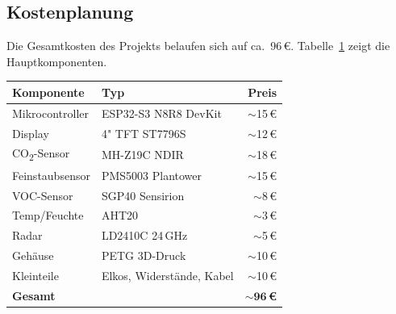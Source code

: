 \subsection{Kostenplanung}

Die Gesamtkosten des Projekts belaufen sich auf ca.\ 96\,\euro{}. Tabelle~\ref{tab:costs} zeigt die Hauptkomponenten.

\begin{table}[htb]
\centering
\renewcommand{\arraystretch}{1.3}
\label{tab:costs}
\begin{tabular}{l l r}
\toprule
\rowcolor{tableheader}
\textbf{Komponente} & \textbf{Typ} & \textbf{Preis} \\
\midrule
Mikrocontroller & ESP32-S3 N8R8 DevKit & ${\sim}$15\,\euro{} \\
Display & 4" TFT ST7796S & ${\sim}$12\,\euro{} \\
CO\textsubscript{2}-Sensor & MH-Z19C NDIR & ${\sim}$18\,\euro{} \\
Feinstaubsensor & PMS5003 Plantower & ${\sim}$15\,\euro{} \\
VOC-Sensor & SGP40 Sensirion & ${\sim}$8\,\euro{} \\
Temp/Feuchte & AHT20 & ${\sim}$3\,\euro{} \\
Radar & LD2410C 24\,GHz & ${\sim}$5\,\euro{} \\
Gehäuse & PETG 3D-Druck & ${\sim}$10\,\euro{} \\
Kleinteile & Elkos, Widerstände, Kabel & ${\sim}$10\,\euro{} \\
\midrule
\textbf{Gesamt} & & $\mathbf{{\sim}96}$\,\textbf{\euro{}} \\
\bottomrule
\end{tabular}
\end{table}
